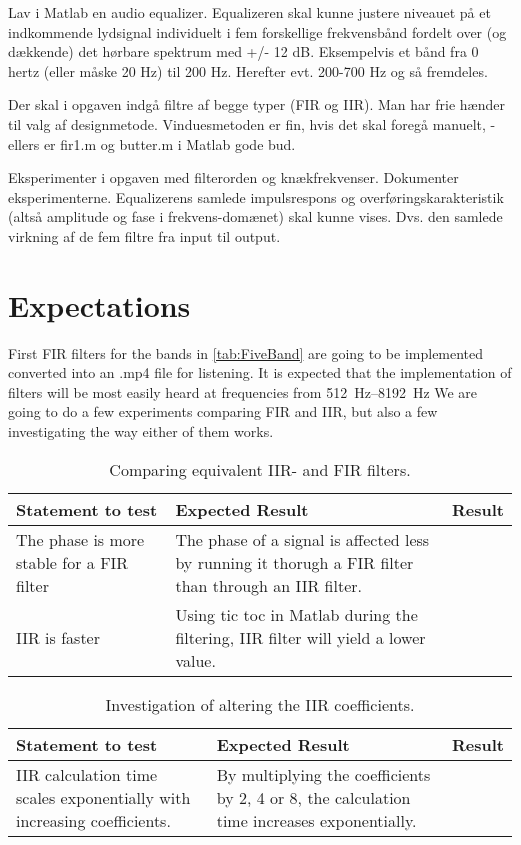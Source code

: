 Lav i Matlab en audio equalizer. Equalizeren skal kunne justere niveauet på et indkommende lydsignal individuelt i fem forskellige frekvensbånd fordelt over (og dækkende) det hørbare spektrum med +/- 12 dB. Eksempelvis et bånd fra 0 hertz (eller måske 20 Hz) til 200 Hz. Herefter evt. 200-700 Hz og så fremdeles.

Der skal i opgaven indgå filtre af begge typer (FIR og IIR). Man har frie hænder til valg af designmetode. Vinduesmetoden er fin, hvis det skal foregå manuelt, - ellers er fir1.m og butter.m i Matlab gode bud.

Eksperimenter i opgaven med filterorden og knækfrekvenser. Dokumenter eksperimenterne. Equalizerens samlede impulsrespons og overføringskarakteristik (altså amplitude og fase i frekvens-domænet) skal kunne vises. Dvs. den samlede virkning af de fem filtre fra input til output.

\section{Expectations}
\label{sec:expectations}

First FIR filters for the bands in \cref{tab:FiveBand} are going to be implemented converted into an .mp4 file for listening. It is expected that the implementation of filters will be most easily heard at frequencies from \SIrange{512}{8192}{\hertz}
We are going to do a few experiments comparing FIR and IIR, but also a few investigating the way either of them works.

\begin{table}
	\caption{Comparing equivalent IIR- and FIR filters.}
	\label{tab:IIRvsFIR}
	\begin{tabularx}{\textwidth}{X X X}
		Statement to test	& Expected Result	& Result \\
		\toprule
		The phase is more stable for a FIR filter & The phase of a signal is affected less by running it thorugh a FIR filter than through an IIR filter. & \\
		IIR is faster		& Using tic toc in Matlab during the filtering, IIR filter will yield a lower value. & \\
	\end{tabularx}
\end{table}

\begin{table}
	\caption{Investigation of altering the IIR coefficients.}
	\label{tab:IIRtest}
	\begin{tabularx}{\textwidth}{X X X}
		Statement to test	& Expected Result	& Result \\
		\toprule
		IIR calculation time scales exponentially with increasing coefficients. & By multiplying the coefficients by 2, 4 or 8, the calculation time increases exponentially. & \\
	\end{tabularx}
\end{table}